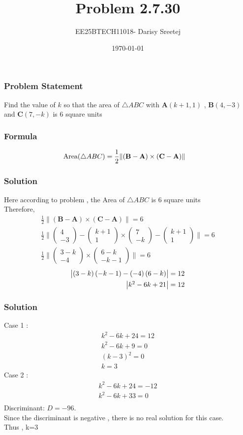 \documentclass{beamer}
\title{Problem 2.7.30}
\author{EE25BTECH11018- Darisy Sreetej}
\date{\today}
\providecommand{\brak}[1]{\ensuremath{\left(#1\right)}}
\theoremstyle{remark}
\providecommand{\norm}[1]{\lVert#1\rVert}
\newcommand{\myvec}[1]{\ensuremath{\begin{pmatrix}#1\end{pmatrix}}}
\let\vec\mathbf
\numberwithin{equation}{section}
\begin{document}
\begin{frame}
\titlepage
\end{frame}

\begin{frame}
\frametitle{Problem Statement}
%
 Find the value of $k$ so that the area of $\triangle$$ABC$ with $\vec{A}\brak{k+1,1}$ , $\vec{B}\brak{4,-3}$ and $\vec{C}\brak{7, -k}$ is $6$ square units
\end{frame}

\begin{frame}
\frametitle{Formula}
\setcounter{section}{1}
\begin{align}
\text{Area\brak{\triangle ABC}}&=\frac12\norm{\brak{\vec{B}-\vec{A}}\times\brak{\vec{C}-\vec{A}}}
\end{align}
\end{frame}
\begin{frame}
\frametitle{Solution}

Here according to problem , the Area of $\triangle$$ABC$ is $6$ square units\\
Therefore,
\begin{align}
\frac{1}{2}\norm{\brak{\vec{B}-\vec{A}}\times\brak{\vec{C}-\vec{A}}}=6\\
\frac{1}{2}\norm{\myvec{4\\-3} - \myvec{k+1\\1} \times \myvec{7\\-k} - \myvec{k+1\\1}}=6\\
\frac{1}{2}\norm{\myvec{3-k\\-4}\times\myvec{6-k\\-k-1}}=6
\end{align}
\begin{align}
\mdet{\brak{3-k}\brak{-k-1} - \brak{-4}\brak{6-k}}=12 \\
\mdet{k^2-6k+21}=12
\end{align}

\end{frame}
\begin{frame}
\frametitle{Solution}
Case 1 :
\begin{align}
   k^2-6k+24=12\\
k^2-6k+9=0\\
(k-3)^2=0\\
k=3
\end{align}
Case 2 :
\begin{align}
k^2-6k+24=-12\\
k^2-6k+33=0\\
\end{align}
Discriminant: $D=-96$.\\ Since the discriminant is negative , there is no real solution for this case.\\

Thus , k=3
\end{frame}
\end{document}
